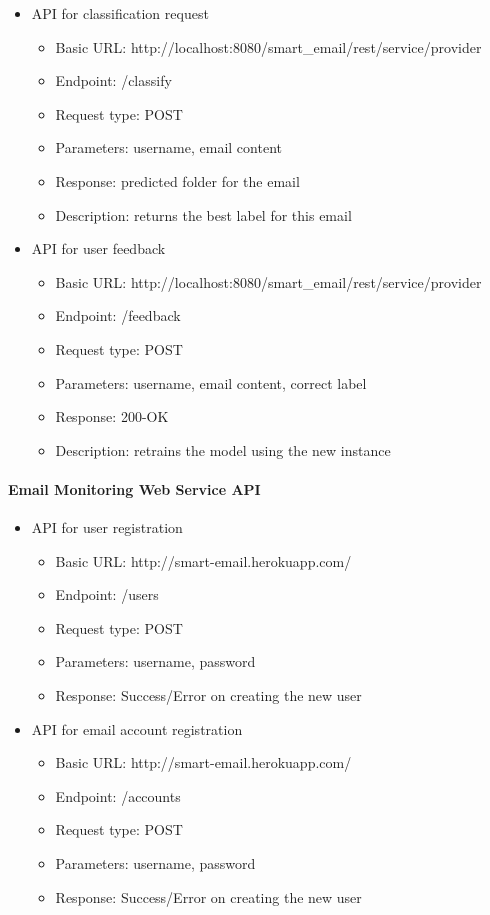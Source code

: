 \begin{itemize}
		\item API for classification request
		\begin{itemize}
			\item Basic URL: http://localhost:8080/smart\_email/rest/service/provider		
			\item Endpoint: /classify
			\item Request type: POST
			\item Parameters: username, email content
			\item Response: predicted folder for the email
			\item Description: returns the best label for this email
		\end{itemize}

		\item API for user feedback
		\begin{itemize}
			\item Basic URL: http://localhost:8080/smart\_email/rest/service/provider
			\item Endpoint: /feedback
			\item Request type: POST
			\item Parameters: username, email content, correct label
			\item Response: 200-OK
			\item Description: retrains the model using the new instance
		\end{itemize}
	\end{itemize}


\newpage
\paragraph{Email Monitoring Web Service API}
\begin{itemize}
	\item API for user registration
	\begin{itemize}
		\item Basic URL: http://smart-email.herokuapp.com/
		\item Endpoint: /users
		\item Request type: POST
		\item Parameters: username, password
		\item Response: Success/Error on creating the new user
	\end{itemize}

	\item API for email account registration
	\begin{itemize}
		\item Basic URL: http://smart-email.herokuapp.com/
		\item Endpoint: /accounts
		\item Request type: POST
		\item Parameters: username, password
		\item Response: Success/Error on creating the new user
	\end{itemize}
\end{itemize}

